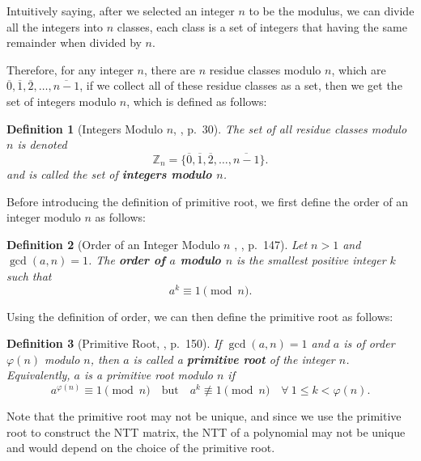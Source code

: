 \documentclass[12pt]{article}
\newtheorem{definition}{Definition}[section]
\begin{document}
Intuitively saying, after we selected an integer $n$ to be the modulus, 
we can divide all the integers into $n$ classes, 
each class is a set of integers that having the same remainder when divided by $n$.

Therefore, for any integer $n$, there are $n$ residue classes modulo $n$, 
which are $\overline{0}, \overline{1}, \overline{2}, \ldots, \overline{n - 1}$, 
if we collect all of these residue classes as a set, 
then we get the set of integers modulo $n$, 
which is defined as follows:

\begin{definition}[Integers Modulo $n$, \cite{algebra}, p.~30]
    The set of all residue classes modulo $n$ is denoted 
    \begin{equation*}
    \mathbb{Z}_n = \{\overline{0}, \overline{1}, \overline{2}, \ldots, \overline{n - 1}\}.
    \end{equation*}
    and is called the set of \textbf{integers modulo $n$}.
\end{definition}

Before introducing the definition of primitive root, 
we first define the order of an integer modulo $n$ as follows:

\begin{definition}[Order of an Integer Modulo $n$ , \cite{number_theory}, p.~147]
    Let $n > 1$ and $\gcd(a, n) = 1$. 
    The \textbf{order of $a$ modulo $n$} is the smallest positive integer $k$ such that
    \begin{equation*}
    a^k \equiv 1 \pmod{n}.
    \end{equation*}
\end{definition}

Using the definition of order, we can then define the primitive root as follows:

\begin{definition}[Primitive Root, \cite{number_theory}, p.~150]
    If $\gcd(a, n) = 1$ and $a$ is of order $\varphi(n)$ modulo $n$, 
    then $a$ is called a \textbf{primitive root} of the integer $n$.
    Equivalently, $a$ is a primitive root modulo $n$ if
    \begin{equation*}
    a^{\varphi(n)} \equiv 1 \pmod{n} \quad \text{but} \quad a^k \not\equiv 1 \pmod{n} \quad \forall \ 1 \leq k < \varphi(n).
    \end{equation*}
\end{definition}

Note that the primitive root may not be unique, and since we use the primitive root to construct the NTT matrix, 
the NTT of a polynomial may not be unique and would depend on the choice of the primitive root.
\cite[pp.~5--6]{beginner_guide}
\bigskip
\end{document}
